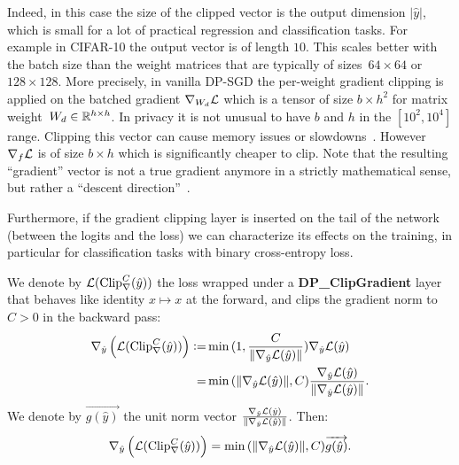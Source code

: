     Indeed, in this case the size of the clipped vector is the output dimension $|\hat y|$, which is small for a lot of practical regression and classification tasks. For example in CIFAR-10 the output vector is of length $10$. This scales better with the batch size than the weight matrices that are typically of sizes~${64\times 64}$ or ${128\times 128}$. More precisely, in vanilla DP-SGD the per-weight gradient clipping is applied on the batched gradient $\nabla_{W_d}\mathcal{L}$ which is a tensor of size $b\times h^2$ for matrix weight~${W_d\in\mathbb{R}^{h\times h}}$. In privacy it is not unusual to have $b$ and $h$ in the $[10^2,10^4]$ range. Clipping this vector can cause memory issues or slowdowns~\cite{lee2021scaling}. However $\nabla_f\mathcal{L}$ is of size $b\times h$ which is significantly cheaper to clip. Note that the resulting ``gradient'' vector is not a true gradient anymore in a strictly mathematical sense, but rather a ``descent direction''~\cite{boyd2004convex}.  
    
    Furthermore, if the gradient clipping layer is inserted on the tail of the network (between the logits and the loss) we can characterize its effects on the training, in particular for classification tasks with binary cross-entropy loss.  

    We denote by $\mathcal{L}(\text{Clip}^C_{\nabla}(\hat y))$ the loss wrapped under a \textbf{DP\_ClipGradient} layer that behaves like identity $x\mapsto x$ at the forward, and clips the gradient norm to $C>0$ in the backward pass:
    \begin{align}
        \nabla_{\hat y}\left(\mathcal{L}(\text{Clip}^C_{\nabla}(\hat y))\right)\vcentcolon=& \min{(1,\frac{C}{\|\nabla_{\hat y}\mathcal{L}(\hat y)\|})}\nabla_{\hat y}\mathcal{L}(\hat y)\\ 
        =&\min{(\|\nabla_{\hat y}\mathcal{L}(\hat y)\|,C)}\frac{\nabla_{\hat y}\mathcal{L}(\hat y)}{\|\nabla_{\hat y}\mathcal{L}(\hat y)\|}.
    \end{align}
    We denote by $\overrightarrow{g(\hat y)}$ the unit norm vector $\frac{\nabla_{\hat y}\mathcal{L}(\hat y)}{\|\nabla_{\hat y}\mathcal{L}(\hat y)\|}$. Then:
    \[
        \nabla_{\hat y}\left(\mathcal{L}(\text{Clip}^C_{\nabla}(\hat y))\right) = \min{(\|\nabla_{\hat y}\mathcal{L}(\hat y)\|,C)}\overrightarrow{g(\hat y)}.
    \]


